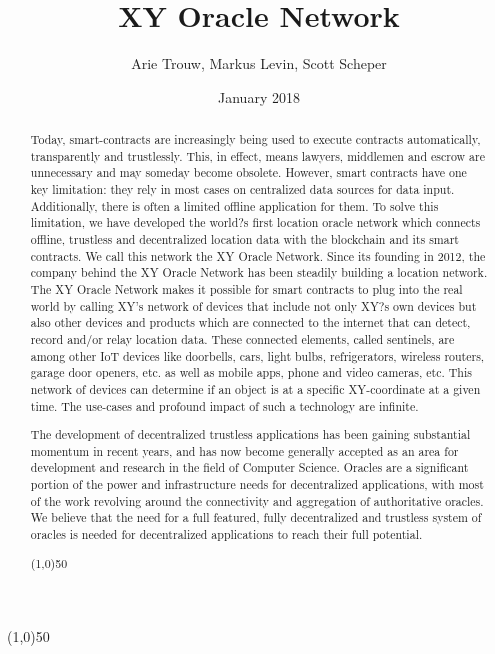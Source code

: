 \documentclass{article}
\title {XY Oracle Network}
\author{Arie Trouw, Markus Levin, Scott Scheper}
\date{January 2018}
\begin{document}
\maketitle
\tableofcontents

\begin{center}
\line(1,0){50}
\end{center}

\begin{abstract}
Today, \glspl{smart-contract} are increasingly being used to execute contracts automatically, transparently and trustlessly. This, in effect, means lawyers, middlemen and escrow are unnecessary and may someday become obsolete. However, smart contracts have one key limitation: they rely in most cases on centralized data sources for data input. Additionally, there is often a limited offline application for them. To solve this limitation, we have developed the world?s first location \gls{oracle} network which connects offline, trustless and decentralized location data with the blockchain and its smart contracts. We call this network the XY Oracle Network. Since its founding in 2012, the company behind the XY Oracle Network has been steadily building a location network. The XY Oracle Network makes it possible for smart contracts to plug into the real world by calling XY's network of devices that include not only XY?s own devices but also other devices and products which are connected to the internet that can detect, record and/or relay location data. These connected elements, called \Glspl{sentinel}, are among other IoT devices like doorbells, cars, light bulbs, refrigerators, wireless routers, garage door openers, etc. as well as mobile apps,  phone and video cameras, etc. This network of devices can determine if an object is at a specific XY-coordinate at a given time. The use-cases and profound impact of such a technology are infinite.

The development of decentralized trustless applications has been gaining substantial momentum in recent years, and has now become generally accepted as an area for development and research in the field of Computer Science. Oracles are a significant portion of the power and infrastructure needs for decentralized applications, with most of the work revolving around the connectivity and aggregation of authoritative oracles. We believe that the need for a full featured, fully decentralized and trustless system of oracles is needed for decentralized applications to reach their full potential.

\begin{center}
\line(1,0){50}
\end{center}

\end{abstract}
\end{document}

